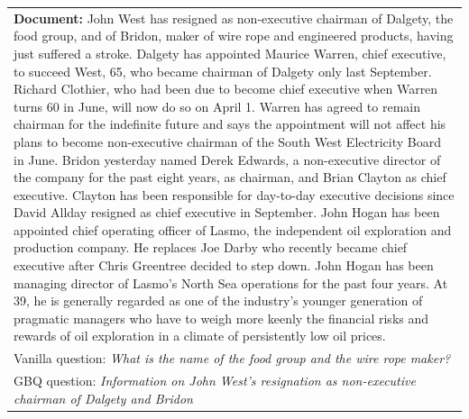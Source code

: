 \documentclass[11pt]{article}
\begin{document}
\begin{table}[htbp!]
\begin{small}
\begin{tabularx}{\textwidth}{X}
\textbf{\textcolor{blu}{Document:}} {\footnotesize John West has resigned as non-executive chairman of Dalgety, the food group, and of Bridon, maker of wire rope and engineered products, having just suffered a stroke. Dalgety has appointed Maurice Warren, chief executive, to succeed West, 65, who became chairman of Dalgety only last September. Richard Clothier, who had been due to become chief executive when Warren turns 60 in June, will now do so on April 1. Warren has agreed to remain chairman for the indefinite future and says the appointment will not affect his plans to become non-executive chairman of the South West Electricity Board in June. Bridon yesterday named Derek Edwards, a non-executive director of the company for the past eight years, as chairman, and Brian Clayton as chief executive. Clayton has been responsible for day-to-day executive decisions since David Allday resigned as chief executive in September. John Hogan has been appointed chief operating officer of Lasmo, the independent oil exploration and production company. He replaces Joe Darby who recently became chief executive after Chris Greentree decided to step down. John Hogan has been managing director of Lasmo's North Sea operations for the past four years. At 39, he is generally regarded as one of the industry's younger generation of pragmatic managers who have to weigh more keenly the financial risks and rewards of oil exploration in a climate of persistently low oil prices.} \\
Vanilla question: \textit{What is the name of the food group and the wire rope maker?}  \\ 
GBQ question:  \textit{Information on John West's resignation as non-executive chairman of Dalgety and Bridon}  \\
\midrule

\end{tabularx}
\end{small}
\end{table}
\end{document}
